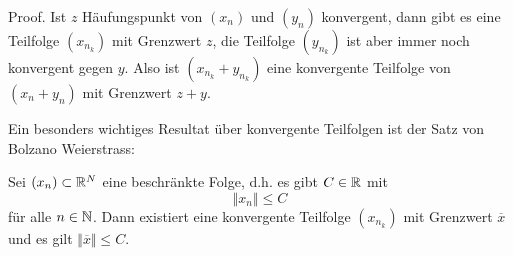 \begin{emphBox}{}{}
Proof.  Ist \(z\) Häufungspunkt von \((x_n)\) und \((y_n)\) konvergent, dann gibt es eine Teilfolge \((x_{n_k})\) mit Grenzwert \(z\), die Teilfolge \((y_{n_k})\) ist aber immer noch konvergent gegen \(y\). Also ist \((x_{n_k}+y_{n_k})\) eine konvergente Teilfolge von \((x_n+y_n)\) mit Grenzwert \(z+y\).
\end{emphBox}

Ein besonders wichtiges Resultat über konvergente Teilfolgen ist der Satz von Bolzano Weierstrass:
\label{metrik/teilfolgen:theorem-5}
\begin{theorem}{}{}



Sei \((x_n) \subset \mathbb{R}^N\) eine beschränkte Folge, d.h. es gibt \(C \in \mathbb{R}\) mit
\begin{equation*}
 \Vert x_n \Vert \leq C
\end{equation*}
für alle \(n \in \mathbb{N}\). Dann existiert eine konvergente Teilfolge \((x_{n_k})\) mit Grenzwert \(\overline{x}\) und es gilt \(\Vert \overline{x} \Vert \leq C\).
\end{theorem}

